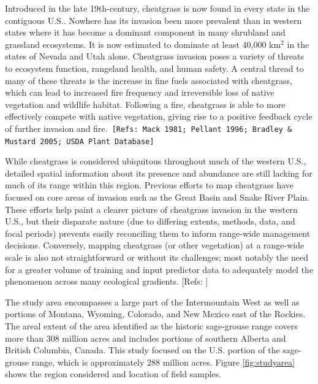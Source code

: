 \def\year{2017}\relax \documentclass[letterpaper]{article}
\begin{document}
 Introduced in the late 19th-century, cheatgrass is now found in every state in the contiguous U.S.. Nowhere has its invasion been more prevalent than in western states where it has become a dominant component in many shrubland and grassland ecosystems. It is now estimated to dominate at least 40,000 km$^2$ in the states of Nevada and Utah alone. Cheatgrass invasion poses a variety of threats to ecosystem function, rangeland health, and human safety. A central thread to many of these threats is the increase in fine fuels associated with cheatgrass, which can lead to increased fire frequency and irreversible loss of native vegetation and wildlife habitat. Following a fire, cheatgrass is able to more effectively compete with native vegetation, giving rise to a positive feedback cycle of further invasion and fire.\texttt{ [Refs: Mack 1981; Pellant 1996; Bradley \& Mustard 2005; USDA Plant Database]}

While cheatgrass is considered ubiquitous throughout much of the western U.S., detailed spatial information about its presence and abundance are still lacking for much of its range within this region. Previous efforts to map cheatgrass have focused on core areas of invasion such as the Great Basin and Snake River Plain. These efforts help paint a clearer picture of cheatgrass invasion in the western U.S., but their disparate nature (due to differing extents, methods, data, and focal periods) prevents easily reconciling them to inform range-wide management decisions. Conversely, mapping cheatgrass (or other vegetation) at a range-wide scale is also not straightforward or without its challenges; most notably the need for a greater volume of training and input predictor data to adequately model the phenomenon across many ecological gradients. [Refs: ]

 
The study area encompasses a large part of the Intermountain West as well as portions of Montana, Wyoming, Colorado, and New Mexico east of the Rockies.  The areal extent of the area identified as the historic sage-grouse range covers more than 308 million acres and includes portions of southern Alberta and British Columbia, Canada.  This study focused on the U.S. portion of the sage-grouse range, which is approximately 288 million acres.
Figure \ref{fig:studyarea} shows the region considered and location of field samples.

\end{document}
